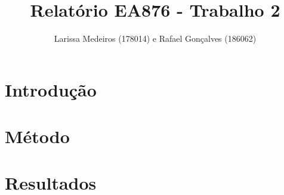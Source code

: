 \documentclass[a4paper, 10pt]{article}
\title{Relatório EA876 - Trabalho 2}
\author{Larissa Medeiros (178014) e Rafael Gonçalves (186062)}
\date{}
\begin{document}
\maketitle
\begin{multicols*}{2}

\section*{Introdução}


\section*{Método}


\section*{Resultados}


\end{multicols*}
\end{document}
